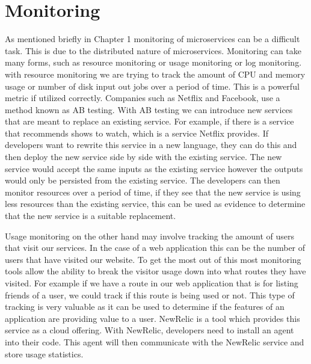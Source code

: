 \section{Monitoring}

As mentioned briefly in Chapter 1 monitoring of microservices can be a difficult task. This is due to the distributed nature of microservices. Monitoring can take many forms, such as resource monitoring or usage monitoring or log monitoring. with resource monitoring we are trying to track the amount of CPU and memory usage or number of disk input out jobs over a period of time. This is a powerful metric if utilized correctly. Companies such as Netflix and Facebook, use a method known as AB testing. With AB testing we can introduce new services that are meant to replace an existing service. For example, if there is a service that recommends shows to watch, which is a service Netflix provides. If developers want to rewrite this service in a new language, they can do this and then deploy the new service side by side with the existing service. The new service would accept the same inputs as the existing service however the outputs would only be persisted from the existing service. The developers can then monitor resources over a period of time, if they see that the new service is using less resources than the existing service, this can be used as evidence to determine that the new service is a suitable replacement.

Usage monitoring on the other hand may involve tracking the amount of users that visit our services. In the case of a web application this can be the number of users that have visited our website. To get the most out of this most monitoring tools allow the ability to break the visitor usage down into what routes they have visited. For example if we have a route in our web application that is for listing friends of a user, we could track if this route is being used or not. This type of tracking is very valuable as it can be used to determine if the features of an application are providing value to a user. NewRelic is a tool which provides this service as a cloud offering. With NewRelic, developers need to install an agent into their code. This agent will then communicate with the NewRelic service and store usage statistics. 

